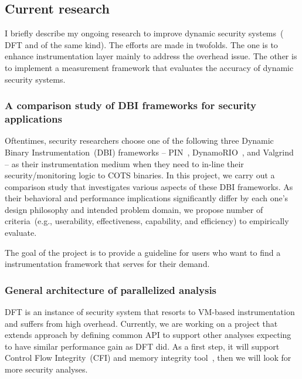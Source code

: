 \documentclass[letterpaper, 10pt]{article}
\begin{document}
\begin{small}
\subsection*{Current research} %
%
%

I briefly describe my ongoing research to improve dynamic security systems~(\ie
DFT and of the same kind). The efforts are made in twofolds.  The one is to enhance
instrumentation layer mainly to address the overhead issue. The other is to
implement a measurement framework that evaluates the accuracy of dynamic
security systems. 


\subsubsection*{A comparison study of DBI frameworks for security applications}
%
Oftentimes, security researchers choose one of the following three Dynamic
Binary Instrumentation~(DBI) frameworks -- PIN~\cite{pin},
DynamoRIO~\cite{dynamorio}, and Valgrind~\cite{valgrind} -- as their
instrumentation medium when they need to in-line their security/monitoring
logic to COTS binaries.
%
In this project, we carry out a comparison study that investigates various
aspects of these DBI frameworks. As their behavioral and performance
implications significantly differ by each one's design philosophy and intended
problem domain, we propose number of criteria~(e.g., userability,
effectiveness, capability, and efficiency) to empirically evaluate.

%
The goal of the project is to provide a guideline for users who want to find a
instrumentation framework that serves for their demand.

\subsubsection*{General architecture of parallelized analysis} 
%
DFT is an instance of security system that resorts to VM-based instrumentation
and suffers from high overhead.
%
Currently, we are working on a project that extends \SR approach by defining
common API to support other analyses expecting to have similar performance gain
as DFT did. 
%
As a first step, it will support Control Flow Integrity~(CFI) and
memory integrity tool~\cite{memcheck}, then we will look for more security
analyses.


\end{small}
\end{document}
